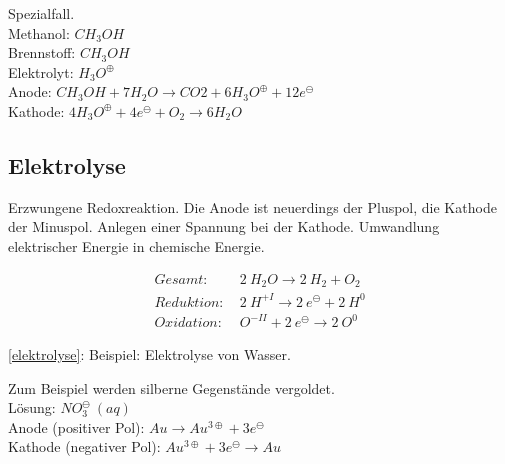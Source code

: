 Spezialfall.\\

Methanol: $CH_3OH$\\

Brennstoff: $CH_3OH$\\

Elektrolyt: $H_3O^\oplus$\\

Anode: $CH_3OH + 7 H_2O \rightarrow CO2 + 6 H_3O^\oplus + 12 e^\ominus$\\

Kathode: $4 H_3O^\oplus + 4e^\ominus + O_2 \rightarrow 6 H_2O$


\subsection{Elektrolyse}

Erzwungene Redoxreaktion. Die Anode ist neuerdings der Pluspol, die Kathode der Minuspol. Anlegen einer Spannung bei der Kathode. Umwandlung elektrischer Energie in chemische Energie.

{\large
	\begin{equation}
		\label{elektrolyse}
		\begin{split}
			Gesamt:\ &2\ H_2O \rightarrow 2\ H_2 + O_2 \\
			Reduktion:\ &2\ H^{+I} \rightarrow 2\ e^\ominus + 2\ H^0 \\
			Oxidation:\ &O^{-II} + 2\ e^\ominus \rightarrow 2\ O^0
		\end{split}
	\end{equation}
}

\ref{elektrolyse}: Beispiel: Elektrolyse von Wasser. \\

\begin{definition}[Galvanisieren]
	Zum Beispiel werden silberne Gegenstände vergoldet.\\
	
	Lösung: $NO_3^\ominus\ (aq)$\\
	
	Anode (positiver Pol): $Au \rightarrow Au^{3\oplus} + 3e^{\ominus}$\\
	
	Kathode (negativer Pol): $Au^{3\oplus} + 3e^{\ominus} \rightarrow Au$
\end{definition}
